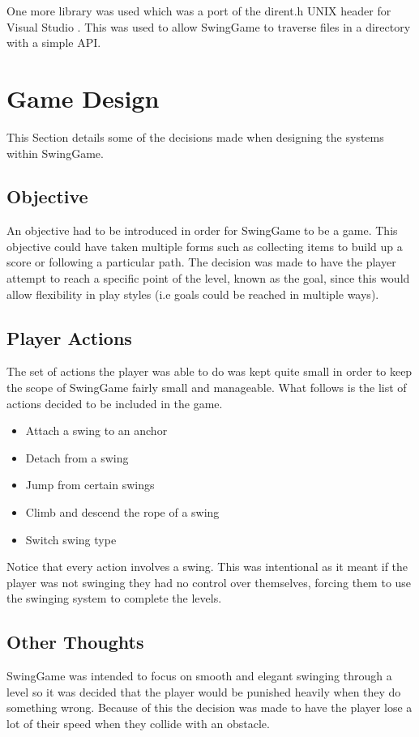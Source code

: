 \documentclass[]{report}
\begin{document}
		One more library was used which was a port of the dirent.h UNIX header for Visual Studio \cite{dirent}. This was used to allow SwingGame to traverse files in a directory with a simple API.
		
	\section{Game Design}
	This Section details some of the decisions made when designing the systems within SwingGame.
	\subsection{Objective}
	An objective had to be introduced in order for SwingGame to be a game. This objective could have taken multiple forms such as collecting items to build up a score or following a particular path. The decision was made to have the player attempt to reach a specific point of the level, known as the goal, since this would allow flexibility in play styles (i.e goals could be reached in multiple ways).
	\subsection{Player Actions}
	The set of actions the player was able to do was kept quite small in order to keep the scope of SwingGame fairly small and manageable. What follows is the list of actions decided to be included in the game.
	\begin{itemize}
		\item{Attach a swing to an anchor}
		\item{Detach from a swing}
		\item{Jump from certain swings}
		\item{Climb and descend the rope of a swing}
		\item{Switch swing type}
	\end{itemize}
	Notice that every action involves a swing. This was intentional as it meant if the player was not swinging they had no control over themselves, forcing them to use the swinging system to complete the levels.
	\subsection{Other Thoughts}
	SwingGame was intended to focus on smooth and elegant swinging through a level so it was decided that the player would be punished heavily when they do something wrong. Because of this the decision was made to have the player lose a lot of their speed when they collide with an obstacle.
	
\end{document}
